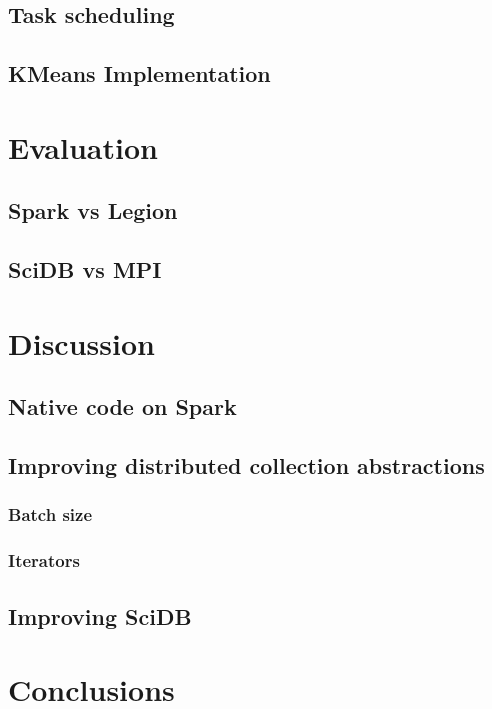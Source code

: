 \documentclass[twocolumn,10pt]{article}
\begin{document}
\subsection{}

\subsection{Task scheduling}

\subsection{KMeans Implementation}

\section{Evaluation}

\subsection{Spark vs Legion}

\subsection{SciDB vs MPI}

\section{Discussion}

\subsection{Native code on Spark}

\subsection{Improving distributed collection abstractions}

\subsubsection{Batch size}

\subsubsection{Iterators}

\subsection{Improving SciDB}

\section{Conclusions}



\end{document}
